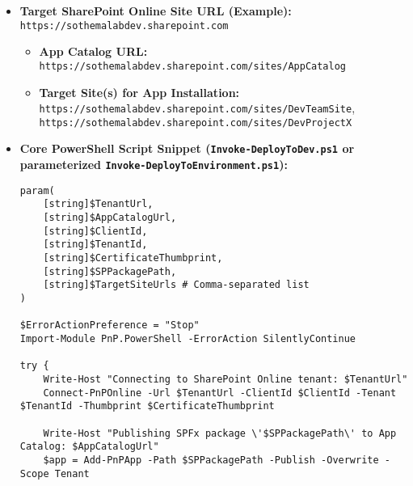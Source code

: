 \begin{itemize}
    \item \textbf{Target SharePoint Online Site URL (Example):} \texttt{https://sothemalabdev.sharepoint.com}
    \begin{itemize}
        \item \textbf{App Catalog URL:} \texttt{https://sothemalabdev.sharepoint.com/sites/AppCatalog}
        \item \textbf{Target Site(s) for App Installation:} \texttt{https://sothemalabdev.sharepoint.com/sites/DevTeamSite}, \texttt{https://sothemalabdev.sharepoint.com/sites/DevProjectX}
    \end{itemize}
    \item \textbf{Core PowerShell Script Snippet (\texttt{Invoke-DeployToDev.ps1} or parameterized \texttt{Invoke-DeployToEnvironment.ps1}):}
\begin{verbatim}
param(
    [string]$TenantUrl,
    [string]$AppCatalogUrl,
    [string]$ClientId,
    [string]$TenantId,
    [string]$CertificateThumbprint,
    [string]$SPPackagePath,
    [string]$TargetSiteUrls # Comma-separated list
)

$ErrorActionPreference = "Stop"
Import-Module PnP.PowerShell -ErrorAction SilentlyContinue

try {
    Write-Host "Connecting to SharePoint Online tenant: $TenantUrl"
    Connect-PnPOnline -Url $TenantUrl -ClientId $ClientId -Tenant $TenantId -Thumbprint $CertificateThumbprint

    Write-Host "Publishing SPFx package \'$SPPackagePath\' to App Catalog: $AppCatalogUrl"
    $app = Add-PnPApp -Path $SPPackagePath -Publish -Overwrite -Scope Tenant


\end{verbatim}
\end{itemize}
